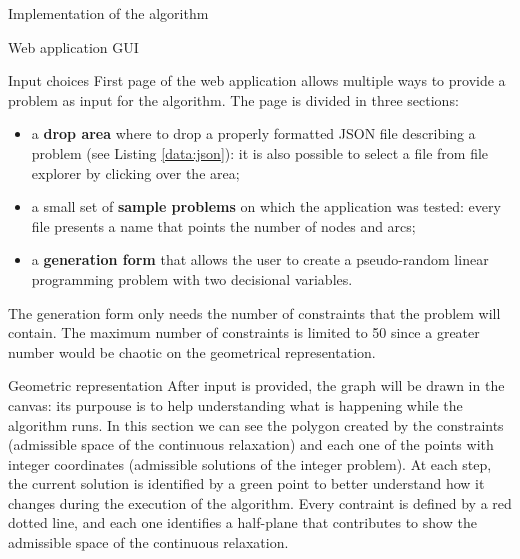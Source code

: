 \documentclass[9pt]{extarticle}
\begin{document}
\begin{section}{Implementation of the algorithm}
\begin{subsection}{Web application GUI}
            \begin{subsubsection}{Input choices}
                \label{subsec:input}
                First page of the web application\cite{web:app} allows multiple ways to provide a problem as input for the algorithm. 
                The page is divided in three sections:
                
                \begin{itemize}
                    \item a \textbf{drop area} where to drop a properly formatted JSON file describing a problem (see Listing \ref{data:json}): 
                            it is also possible to select a file from file explorer by clicking over the area;
                    \item a small set of \textbf{sample problems} on which the application was tested: every file presents a name that points the 
                            number of nodes and arcs;
                    \item a \textbf{generation form} that allows the user to create a pseudo-random linear programming problem with two decisional
                            variables.
                \end{itemize}

                The generation form only needs the number of constraints that the problem will contain.
                The maximum number of constraints is limited to 50 since a greater number would be chaotic on the geometrical representation.
            \end{subsubsection}

            \begin{subsubsection}{Geometric representation}
                After input is provided, the graph will be drawn in the canvas: its purpouse is to help understanding what is happening while the 
                algorithm runs.
                In this section we can see the polygon created by the constraints (admissible space of the continuous relaxation) and each one of the 
                points with integer coordinates (admissible solutions of the integer problem).
                At each step, the current solution is identified by a green point to better understand how it changes during the execution of the
                algorithm.
                Every contraint is defined by a red dotted line, and each one identifies a half-plane that contributes to show the admissible space
                of the continuous relaxation.
            \end{subsubsection}
            

\end{subsection}
\end{section}
\end{document}
